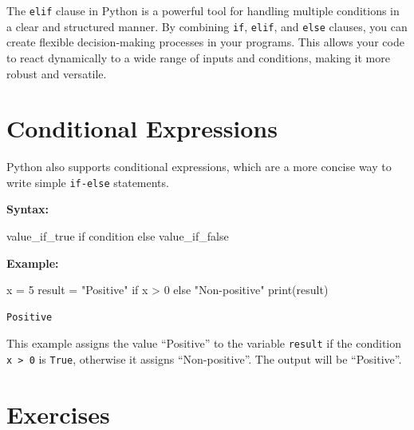 \documentclass[
  letterpaper,
  DIV=11,
  numbers=noendperiod]{scrreprt}
\newenvironment{Shaded}{\begin{snugshade}}{\end{snugshade}}
\newcommand{\BuiltInTok}[1]{\textcolor[rgb]{0.00,0.23,0.31}{#1}}
\newcommand{\ControlFlowTok}[1]{\textcolor[rgb]{0.00,0.23,0.31}{#1}}
\newcommand{\DecValTok}[1]{\textcolor[rgb]{0.68,0.00,0.00}{#1}}
\newcommand{\NormalTok}[1]{\textcolor[rgb]{0.00,0.23,0.31}{#1}}
\newcommand{\OperatorTok}[1]{\textcolor[rgb]{0.37,0.37,0.37}{#1}}
\newcommand{\StringTok}[1]{\textcolor[rgb]{0.13,0.47,0.30}{#1}}
\begin{document}
The \texttt{elif} clause in Python is a powerful tool for handling
multiple conditions in a clear and structured manner. By combining
\texttt{if}, \texttt{elif}, and \texttt{else} clauses, you can create
flexible decision-making processes in your programs. This allows your
code to react dynamically to a wide range of inputs and conditions,
making it more robust and versatile.

\hypertarget{conditional-expressions}{%
\section{Conditional Expressions}\label{conditional-expressions}}

Python also supports conditional expressions, which are a more concise
way to write simple \texttt{if-else} statements.

\textbf{Syntax:}

\begin{Shaded}
\begin{Highlighting}[]
\NormalTok{value\_if\_true }\ControlFlowTok{if}\NormalTok{ condition }\ControlFlowTok{else}\NormalTok{ value\_if\_false}
\end{Highlighting}
\end{Shaded}

\textbf{Example:}

\begin{Shaded}
\begin{Highlighting}[]
\NormalTok{x }\OperatorTok{=} \DecValTok{5}
\NormalTok{result }\OperatorTok{=} \StringTok{"Positive"} \ControlFlowTok{if}\NormalTok{ x }\OperatorTok{\textgreater{}} \DecValTok{0} \ControlFlowTok{else} \StringTok{"Non{-}positive"}
\BuiltInTok{print}\NormalTok{(result)}
\end{Highlighting}
\end{Shaded}

\begin{verbatim}
Positive
\end{verbatim}

This example assigns the value ``Positive'' to the variable
\texttt{result} if the condition \texttt{x\ \textgreater{}\ 0} is
\texttt{True}, otherwise it assigns ``Non-positive''. The output will be
``Positive''.

\hypertarget{exercises-2}{%
\section{Exercises}\label{exercises-2}}
\end{document}
